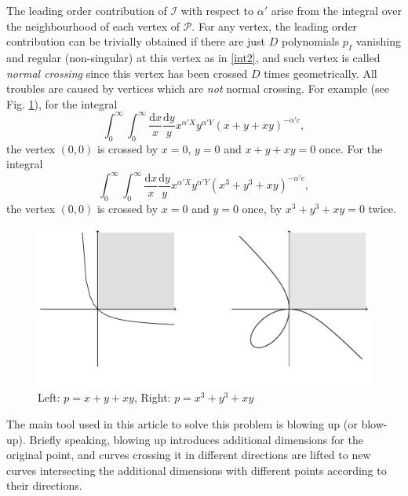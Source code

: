 \documentclass[12pt]{article}
\theoremstyle{definition}
\theoremstyle{plain}
\newcommand{\dif}{\mathrm{d}} %
\begin{document}
The leading order contribution of $\mathcal{I}$ with respect to $\alpha'$ arise from the integral over the neighbourhood of each vertex of $\mathcal{P}$. For any vertex, the leading order contribution can be trivially obtained if there are just $D$ polynomials $p_{I}$ vanishing and regular (non-singular) at this vertex as in \eqref{int2}, and such vertex is called {\it{normal crossing}} since this vertex has been crossed $D$ times geometrically. All troubles are caused by vertices which are {\it not} normal crossing. For example (see Fig. \ref{fig_1}), for the integral 
\begin{equation}\label{exam:1}
	\int_0^\infty \int_0^\infty \frac{\dif x}{x}\frac{\dif y}{y}x^{\alpha' X}
	y^{\alpha' Y}(x+y+ xy)^{-\alpha' c},
\end{equation}
the vertex $(0,0)$ is crossed by $x=0$, $y=0$ and $x+y+xy=0$ once. 
For the integral
\begin{equation}\label{exam:2}
\int_0^\infty \int_0^\infty \frac{\dif x}{x}\frac{\dif y}{y}x^{\alpha' X}
y^{\alpha' Y}(x^3+y^3+ xy)^{-\alpha' c},
\end{equation}
the vertex $(0,0)$ is crossed by $x=0$ and $y=0$ once, by $x^3+y^3+xy=0$ twice. 

\begin{figure}[h]
\begin{center}
\includegraphics[scale=0.75]{fig_1.pdf}
\end{center}
\vspace{-5ex}
\caption{Left: $p=x+y+xy$, Right: $p=x^3+y^3+xy$}
\label{fig_1}
\end{figure}

The main tool used in this article to solve this problem is blowing up (or blow-up).
Briefly speaking, blowing up introduces additional dimensions for the original point,
and curves crossing it in different directions are lifted to new curves 
intersecting the additional dimensions with different points according to their directions.
\end{document}
